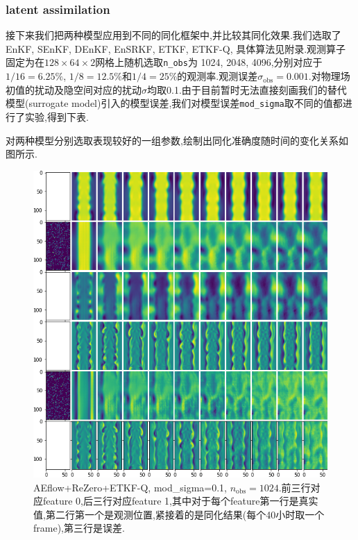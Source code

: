 \documentclass{article}
\begin{document}
\subsubsection{latent assimilation}
接下来我们把两种模型应用到不同的同化框架中,并比较其同化效果.我们选取了EnKF, SEnKF, DEnKF, EnSRKF, ETKF, ETKF-Q, 具体算法见附录.观测算子固定为在$128\times64\times2$网格上随机选取\texttt{n\_obs}为 1024, 2048, 4096,分别对应于$1/16=6.25\%$, $1/8=12.5\%$和$1/4=25\%$的观测率.观测误差$\sigma_\textrm{obs}=0.001$.对物理场初值的扰动及隐空间对应的扰动$\sigma$均取0.1.由于目前暂时无法直接刻画我们的替代模型(surrogate model)引入的模型误差,我们对模型误差\texttt{mod\_sigma}取不同的值都进行了实验,得到下表.



对两种模型分别选取表现较好的一组参数,绘制出同化准确度随时间的变化关系如图所示.
\begin{figure}
	\centering
	\includegraphics[width=.8\textwidth]{figs/sigma_x_b=0.1_sigma_z_b=0.1_mod_sigma=0.1_n_obs=1024_method=ETKF-Q_plot.png}
	\caption{AEflow+ReZero+ETKF-Q, mod\_sigma=0.1, $n_\textrm{obs}=1024$.前三行对应feature 0,后三行对应feature 1,其中对于每个feature第一行是真实值,第二行第一个是观测位置,紧接着的是同化结果(每个40小时取一个frame),第三行是误差.}
\end{figure}
\end{document}
